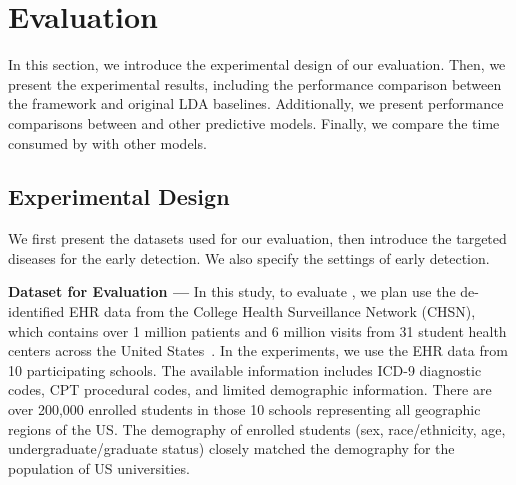 \section{Evaluation}\label{sec:5}
In this section, we introduce the experimental design of our evaluation.
Then, we present the experimental results, including the performance comparison between the \TheName{} framework and original LDA baselines.
Additionally, we present performance comparisons between \TheName{} and other predictive models. 
Finally, we compare the time consumed by \TheName{} with other models.

\subsection{Experimental Design}
We first present the datasets used for our evaluation, then introduce the targeted diseases for the early detection.  We also specify the settings of early detection.

\textbf{Dataset for Evaluation --- } In this study, to evaluate \TheName{}, we plan use the de-identified EHR data from the College Health Surveillance Network (CHSN), which contains over 1 million patients and 6 million visits from 31 student health centers across the United States~\cite{turner_college_2015}. 
In the experiments, we use the EHR data from 10 participating schools. 
The available information includes ICD-9 diagnostic codes, CPT procedural codes, and limited demographic information. There are over 200,000 enrolled students in those 10 schools representing all geographic regions of the US. The demography of enrolled students (sex, race/ethnicity, age, undergraduate/graduate status) closely matched the demography for the population of US universities.

